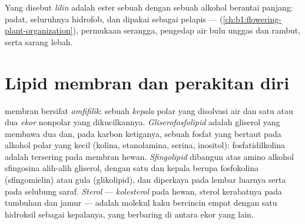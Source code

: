 \begin{definition}[Lilin]\label{def:b1:lipids:wax}
Yang disebut \emph{lilin} adalah ester sebuah 
dengan sebuah alkohol berantai panjang: padat, seluruhnya hidrofob, dan
dipakai sebagai pelapis ---  
(\cref{ch:b1:flowering-plant-organization}), permukaan serangga,
pengedap air bulu unggas dan rambut, serta sarang lebah.
\end{definition}

\section{Lipid membran dan perakitan diri}

\begin{definition}\label{def:b1:lipids:amphiphilic}
 membran bersifat \emph{amfifilik}:
sebuah \emph{kepala} polar yang disolvasi air dan satu atau dua
\emph{ekor} nonpolar yang dikucilkannya.
\emph{Gliserofosfolipid} adalah gliserol yang membawa
dua  dan, pada karbon ketiganya, sebuah fosfat yang bertaut
pada alkohol polar yang kecil (kolina, etanolamina, serina, inositol):
fosfatidilkolina adalah  tersering pada membran hewan.
\emph{Sfingolipid} dibangun atas amino alkohol
sfingosina alih-alih gliserol, dengan satu  dan kepala berupa
fosfokolina (sfingomielin) atau gula (glikolipid), dan diperkaya pada
lembar luarnya serta pada selubung saraf. \emph{Sterol}
--- \emph{kolesterol} pada hewan, sterol kerabatnya
pada tumbuhan dan jamur --- adalah molekul kaku bercincin empat dengan
satu hidroksil sebagai kepalanya, yang berbaring di antara ekor 
yang lain.
\end{definition}

